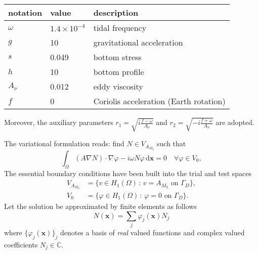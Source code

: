 \documentclass[11pt,a4paper]{article}
\begin{document}
\begin{center}
\begin{tabular}{|l|l|l|}
\hline
notation & value & description\\
\hline
$\omega$ & $1.4\times 10^{-4}$ &tidal frequency\\
$g$ & 10 & gravitational acceleration\\
$s$ & 0.049 & bottom stress\\
$h$ & 10 & bottom profile\\
$A_\nu$ & 0.012 & eddy viscosity\\
$f$ & 0 & Coriolis acceleration (Earth rotation)\\
\hline
\end{tabular}
\end{center}
Moreover, the auxiliary parameters $r_1=\sqrt{i\frac{f-\omega}{A_\nu}}$ and $r_2=\sqrt{-i\frac{f+\omega}{A_\nu}}$ are adopted.

The variational formulation reads: find $N\in V_{A_{M_2}}$ such that
\begin{equation}
\int_\Omega(A\nabla N)\cdot\nabla \varphi- i\omega N \varphi\,\mathrm{d}\mathbf{x}=0\quad \forall \varphi\in V_0,
\end{equation}
The essential boundary conditions have been built into the trial and test spaces
\begin{align}
V_{A_{M_2}}&=\{v\in H_1(\Omega)\,:\, v=A_{M_2}\text{ on }\Gamma_D\},\\
V_0&=\{\varphi\in H_1(\Omega)\,:\, \varphi=0\text{ on }\Gamma_D\}.
\end{align}
Let the solution be approximated by finite elements as follows
\begin{equation}
N(\mathbf{x})=\sum_{j}\varphi_j(\mathbf{x})N_j 
\end{equation}
where $\{\varphi_j(\mathbf{x})\}_j$ denotes a basis of \emph{real} valued functions and complex valued coefficients $N_j\in\mathbb{C}$.
\end{document}
